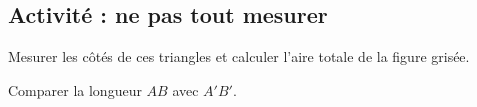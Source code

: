 
\subsection*{Activité : ne pas tout mesurer}


Mesurer les côtés de ces triangles et calculer l'aire totale de la figure grisée.
\begin{center}
   
\end{center}
Comparer la longueur \( AB\) avec \( A'B'\).


